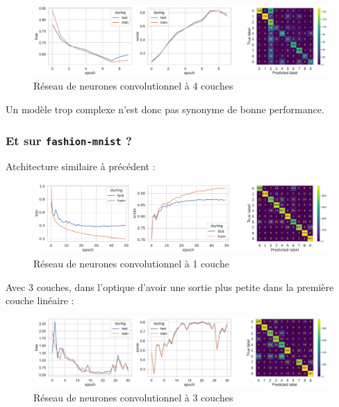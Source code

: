 \documentclass{article}
\begin{document}
\begin{figure}[htbp]
    \centering
    \includegraphics[width=\textwidth]{conv/conv_4layers.pdf}
    \caption{Réseau de neurones convolutionnel à 4 couches}
    \label{fig:conv4layers}
\end{figure}

Un modèle trop complexe n'est donc pas synonyme de bonne performance.

\subsubsection{Et sur \texttt{fashion-mnist} ?}

Atchitecture similaire à précédent :

\begin{figure}[htbp]
    \centering
    \includegraphics[width=\textwidth]{conv/fashion_conv_1layer_2linear.pdf}
    \caption{Réseau de neurones convolutionnel à 1 couche}
    \label{fig:conv2layers_fashion}
\end{figure}

Avec 3 couches, dans l'optique d'avoir une sortie plus petite dans la première couche linéaire :

\begin{figure}[htbp]
    \centering
    \includegraphics[width=\textwidth]{conv/fashion_conv_3layers_2linear.pdf}
    \caption{Réseau de neurones convolutionnel à 3 couches}
    \label{fig:conv3layers_fashion}
\end{figure}
\end{document}
